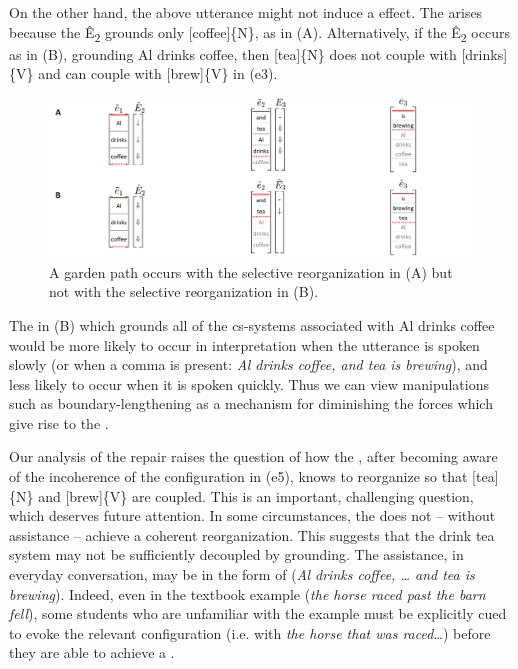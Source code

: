   On the other hand, the above utterance might not induce a  effect. The  arises because the  Ê\textsubscript{2} grounds only [coffee]\{N\}, as in {}(A). Alternatively, if the  Ê\textsubscript{2} occurs as in (B), grounding {\textbar}Al drinks coffee{\textbar}, then [tea]\{N\} does not couple with [drinks]\{V\} and can couple with [brew]\{V\} in (e3).

  
\begin{figure}
\includegraphics[width=\textwidth]{figures/Tilsen-img131.png}
\caption{A garden path occurs with the selective reorganization in (A) but not with the selective reorganization in (B).}
\label{fig:6:12}
\end{figure}
 

  The  in (B) which grounds all of the cs-sys\-tems associated with {\textbar}Al drinks coffee{\textbar} would be more likely to occur in interpretation when the utterance is spoken slowly (or when a comma is present: \textit{Al drinks coffee, and tea is brewing}), and less likely to occur when it is spoken quickly. Thus we can view  manipulations such as boundary-lengthening as a mechanism for diminishing the forces which give rise to the .

  Our analysis of the  repair raises the question of how the , after becoming aware of the incoherence of the configuration in (e5), knows to reorganize so that [tea]\{N\} and [brew]\{V\} are coupled. This is an important, challenging question, which deserves future attention. In some circumstances, the  does not -- without assistance -- achieve a coherent reorganization. This suggests that the {\textbar}drink tea{\textbar} system may not be sufficiently decoupled by grounding. The assistance, in everyday conversation, may be in the form of  (\textit{Al drinks coffee, … and tea is brewing}). Indeed, even in the textbook example (\textit{the horse raced past the barn fell}), some students who are unfamiliar with the example must be explicitly cued to evoke the relevant configuration (i.e. with \textit{the horse that was raced…}) before they are able to achieve a . 

